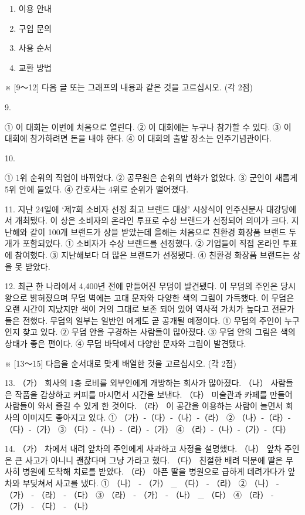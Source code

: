\documentclass[12pt]{article}
\begin{document}
\begin{enumerate}[1.]
    \begin{enumerate}[1)]
        \item 이용 안내
        \item 구입 문의
        \item 사용 순서
        \item 교환 방법
    \end{enumerate}




※ [9～12] 다음 글 또는 그래프의 내용과 같은 것을 고르십시오. (각 2점)

9.

① 이 대회는 이번에 처음으로 열린다.
② 이 대회에는 누구나 참가할 수 있다.
③ 이 대회에 참가하려면 돈을 내야 한다.
④ 이 대회의 출발 장소는 인주기념관이다.


10.

① 1위 순위의 직업이 바뀌었다.
② 공무원은 순위의 변화가 없었다.
③ 군인이 새롭게 5위 안에 들었다.
④ 간호사는 4위로 순위가 떨어졌다.


11.
  지난 24일에 ‘제7회 소비자 선정 최고 브랜드 대상’ 시상식이 인주신문사
대강당에서 개최됐다. 이 상은 소비자의 온라인 투표로 수상 브랜드가
선정되어 의미가 크다. 지난해와 같이 100개 브랜드가 상을 받았는데 올해는
처음으로 친환경 화장품 브랜드 두 개가 포함되었다.
① 소비자가 수상 브랜드를 선정했다.
② 기업들이 직접 온라인 투표에 참여했다.
③ 지난해보다 더 많은 브랜드가 선정됐다.
④ 친환경 화장품 브랜드는 상을 못 받았다.


12.
  최근 한 나라에서 4,400년 전에 만들어진 무덤이 발견됐다. 이 무덤의
주인은 당시 왕으로 밝혀졌으며 무덤 벽에는 고대 문자와 다양한 색의
그림이 가득했다. 이 무덤은 오랜 시간이 지났지만 색이 거의 그대로 보존
되어 있어 역사적 가치가 높다고 전문가들은 전했다. 무덤의 일부는 일반인
에게도 곧 공개될 예정이다.
① 무덤의 주인이 누구인지 찾고 있다.
② 무덤 안을 구경하는 사람들이 많아졌다.
③ 무덤 안의 그림은 색의 상태가 좋은 편이다.
④ 무덤 바닥에서 다양한 문자와 그림이 발견됐다.




※ [13～15] 다음을 순서대로 맞게 배열한 것을 고르십시오. (각 2점)

13.
（가） 회사의 1층 로비를 외부인에게 개방하는 회사가 많아졌다.
（나） 사람들은 작품을 감상하고 커피를 마시면서 시간을 보낸다.
（다） 미술관과 카페를 만들어 사람들이 와서 즐길 수 있게 한 것이다.
（라） 이 공간을 이용하는 사람이 늘면서 회사의 이미지도 좋아지고 있다.
① （가）-（다）-（나）-（라）	② （나）-（라）-（다）-（가）
③ （다）-（나）-（라）-（가）	④ （라）-（나）-（가）-（다）


14.
（가） 차에서 내려 앞차의 주인에게 사과하고 사정을 설명했다.
（나） 앞차 주인은 큰 사고가 아니니 괜찮다며 그냥 가라고 했다.
（다） 친절한 배려 덕분에 딸은 무사히 병원에 도착해 치료를 받았다.
（라） 아픈 딸을 병원으로 급하게 데려가다가 앞차와 부딪쳐서 사고를 냈다.
① （나） - （가） _ （다） - （라）	② （나） - （가） - （라） - （다）
③ （라） - （가） - （나） _ （다）	④ （라） - （가） - （다） - （나）



\end{enumerate}
\end{document}
